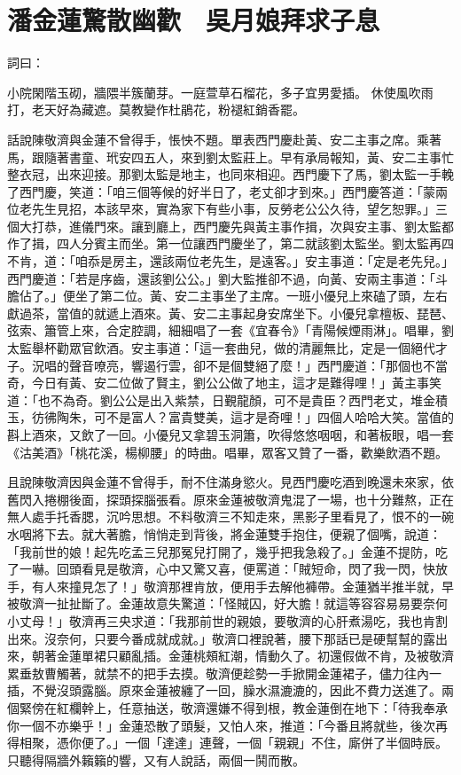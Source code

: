 %

\chapter{潘金蓮驚散幽歡　吳月娘拜求子息}

詞曰：

小院閑階玉砌，牆隈半簇蘭芽。一庭萱草石榴花，多子宜男愛插。
休使風吹雨打，老天好為藏遮。莫教變作杜鵑花，粉褪紅銷香罷。

話說陳敬濟與金蓮不曾得手，悵怏不題。單表西門慶赴黃、安二主事之席。乘著馬，跟隨著書童、玳安四五人，來到劉太監莊上。早有承局報知，黃、安二主事忙整衣冠，出來迎接。那劉太監是地主，也同來相迎。西門慶下了馬，劉太監一手輓了西門慶，笑道：「咱三個等候的好半日了，老丈卻才到來。」西門慶答道：「蒙兩位老先生見招，本該早來，實為家下有些小事，反勞老公公久待，望乞恕罪。」三個大打恭，進儀門來。讓到廳上，西門慶先與黃主事作揖，次與安主事、劉太監都作了揖，四人分賓主而坐。第一位讓西門慶坐了，第二就該劉太監坐。劉太監再四不肯，道：「咱忝是房主，還該兩位老先生，是遠客。」安主事道：「定是老先兒。」西門慶道：「若是序齒，還該劉公公。」劉大監推卻不過，向黃、安兩主事道：「斗膽佔了。」便坐了第二位。黃、安二主事坐了主席。一班小優兒上來磕了頭，左右獻過茶，當值的就遞上酒來。黃、安二主事起身安席坐下。小優兒拿檀板、琵琶、弦索、簫管上來，合定腔調，細細唱了一套《宜春令》「青陽候煙雨淋」。唱畢，劉太監舉杯勸眾官飲酒。安主事道：「這一套曲兒，做的清麗無比，定是一個絕代才子。況唱的聲音嘹亮，響遏行雲，卻不是個雙絕了麼！」西門慶道：「那個也不當奇，今日有黃、安二位做了賢主，劉公公做了地主，這才是難得哩！」黃主事笑道：「也不為奇。劉公公是出入紫禁，日覲龍顏，可不是貴臣？西門老丈，堆金積玉，彷彿陶朱，可不是富人？富貴雙美，這才是奇哩！」四個人哈哈大笑。當值的斟上酒來，又飲了一回。小優兒又拿碧玉洞簫，吹得悠悠咽咽，和著板眼，唱一套《沽美酒》「桃花溪，楊柳腰」的時曲。唱畢，眾客又贊了一番，歡樂飲酒不題。

且說陳敬濟因與金蓮不曾得手，耐不住滿身慾火。見西門慶吃酒到晚還未來家，依舊閃入捲棚後面，探頭探腦張看。原來金蓮被敬濟鬼混了一場，也十分難熬，正在無人處手托香腮，沉吟思想。不料敬濟三不知走來，黑影子里看見了，恨不的一碗水咽將下去。就大著膽，悄悄走到背後，將金蓮雙手抱住，便親了個嘴，說道： 「我前世的娘！起先吃孟三兒那冤兒打開了，幾乎把我急殺了。」金蓮不提防，吃了一嚇。回頭看見是敬濟，心中又驚又喜，便罵道：「賊短命，閃了我一閃，快放手，有人來撞見怎了！」敬濟那裡肯放，便用手去解他褲帶。金蓮猶半推半就，早被敬濟一扯扯斷了。金蓮故意失驚道：「怪賊囚，好大膽！就這等容容易易要奈何小丈母！」敬濟再三央求道：「我那前世的親娘，要敬濟的心肝煮湯吃，我也肯割出來。沒奈何，只要今番成就成就。」敬濟口裡說著，腰下那話已是硬幫幫的露出來，朝著金蓮單裙只顧亂插。金蓮桃頰紅潮，情動久了。初還假做不肯，及被敬濟累垂敖曹觸著，就禁不的把手去摸。敬濟便趁勢一手掀開金蓮裙子，儘力往內一插，不覺沒頭露腦。原來金蓮被纏了一回，臊水濕漉漉的，因此不費力送進了。兩個緊傍在紅欄幹上，任意抽送，敬濟還嫌不得到根，教金蓮倒在地下：「待我奉承你一個不亦樂乎！」金蓮恐散了頭髮，又怕人來，推道：「今番且將就些，後次再得相聚，憑你便了。」一個「達達」連聲，一個「親親」不住，廝併了半個時辰。只聽得隔牆外籟籟的響，又有人說話，兩個一鬨而散。

